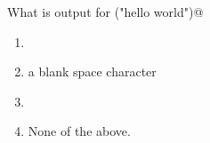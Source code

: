 \question
What is output for \lstinline@min("hello world")@

\begin{enumerate}
\item \lstinline@e@
\item a blank space character
\item \lstinline@w@
\item None of the above.
\end{enumerate}


